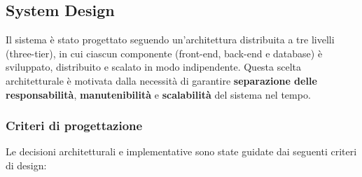 \subsection{System Design}
\label{sec:system-design}

Il sistema \productname{} è stato progettato seguendo un'architettura distribuita a tre livelli (three-tier), in cui ciascun componente (front-end, back-end e database) è sviluppato, distribuito e scalato in modo indipendente. Questa scelta architetturale è motivata dalla necessità di garantire \textbf{separazione delle responsabilità}, \textbf{manutenibilità} e \textbf{scalabilità} del sistema nel tempo.

\subsubsection{Criteri di progettazione}
\label{subsec:criteri-progettazione}

Le decisioni architetturali e implementative sono state guidate dai seguenti criteri di design:

